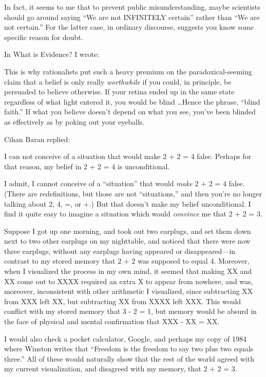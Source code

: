 {
 In fact, it seems to me that to prevent public misunderstanding,
maybe scientists should go around saying ``We are not
INFINITELY certain'' rather than
``We are not certain.'' For the
latter case, in ordinary discourse, suggests you know some specific
reason for doubt.}

\myendsectiontext


{
 In What is Evidence? I wrote:}

{
 This is why rationalists put such a heavy premium on the
paradoxical-seeming claim that a belief is only really
\textit{worthwhile} if you could, in principle, be persuaded to believe
otherwise. If your retina ended up in the same state regardless of what
light entered it, you would be blind \ldots Hence the phrase,
``blind faith.'' If what you believe
doesn't depend on what you see, you've
been blinded as effectively as by poking out your eyeballs.}

{
 Cihan Baran replied:}

{
 I can not conceive of a situation that would make 2 + 2 = 4 false.
Perhaps for that reason, my belief in 2 + 2 = 4 is unconditional.}

{
 I admit, I cannot conceive of a
``situation'' that would
\textit{make} 2 + 2 = 4 false. (There are redefinitions, but those are
not ``situations,'' and then
you're no longer talking about 2, 4, =, or +.) But that
doesn't make my belief unconditional. I find it quite
easy to imagine a situation which would \textit{convince} me that 2 + 2
= 3.}

{
 Suppose I got up one morning, and took out two earplugs, and set
them down next to two other earplugs on my nighttable, and noticed that
there were now three earplugs, without any earplugs having appeared or
disappeared---in contrast to my stored memory that 2 + 2 was supposed
to equal 4. Moreover, when I visualized the process in my own mind, it
seemed that making XX and XX come out to XXXX required an extra X to
appear from nowhere, and was, moreover, inconsistent with other
arithmetic I visualized, since subtracting XX from XXX left XX, but
subtracting XX from XXXX left XXX. This would conflict with my stored
memory that 3 - 2 = 1, but memory would be absurd in the face of
physical and mental confirmation that XXX - XX = XX.}

{
 I would also check a pocket calculator, Google, and perhaps my
copy of 1984 where Winston writes that ``Freedom is
the freedom to say two plus two equals three.'' All
of these would naturally show that the rest of the world agreed with my
current visualization, and disagreed with my memory, that 2 + 2 = 3.}

